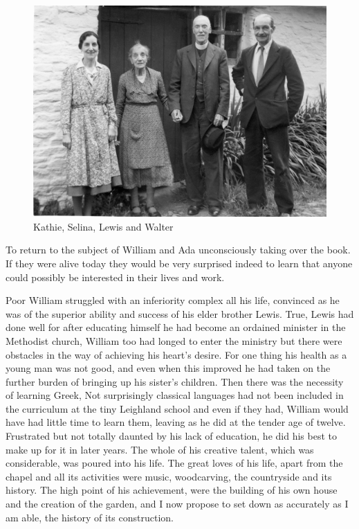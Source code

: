 \begin{figure}
     \includegraphics[width=1\textwidth]{figures/familyPhoto}
     \caption{Kathie, Selina, Lewis and Walter}
     \label{fig:Family}
\end{figure}

To return to the subject of William and Ada unconsciously taking over the book. If they were alive today they would be very surprised indeed to learn that anyone could possibly be interested in their lives and work.

Poor William struggled with an inferiority complex all his life, convinced as he was of the superior ability and success of his elder brother Lewis. True, Lewis had done well for after educating himself he had become an ordained minister in the Methodist church, William too had longed to enter the ministry but there were obstacles in the way of achieving his heart’s desire. For one thing his health as a young man was not good, and even when this improved he had taken on the further burden of bringing up his sister's children. Then there was the necessity of learning Greek, Not surprisingly classical languages had not been included in the curriculum at the tiny Leighland school and even if they had, William would have had little time to learn them, leaving as he did at the tender age of twelve. Frustrated but not totally daunted by his lack of education, he did his best to make up for it in later years. The whole of his creative talent, which was considerable, was poured into his life. The great loves of his life, apart from the chapel and all its activities were music, woodcarving, the countryside and its history. The high point of his achievement, were the building of his own house and the creation of the garden, and I now propose to set down as accurately as I am able, the history of its construction.